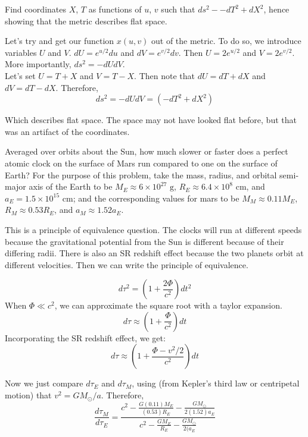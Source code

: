 \documentclass[11pt,largemargins]{homework}
\begin{document}
\begin{alphaparts}
\questionpart
Find coordinates $X$, $T$ as functions of $u$, $v$ such that $ds^2 - -dT^2 + dX^2$, hence showing that the metric describes flat space.

Let's try and get our function $x(u,v)$ out of the metric.  To do so, we introduce variables $U$ and $V$.  $dU = e^{u/2} du$ and $dV = e^{v/2} dv$.  Then $U = 2e^{u/2}$ and $V = 2e^{v/2}.$  More importantly, $ds^2 = -dUdV$. \\ 

Let's set $U = T + X$ and $V = T - X$.  Then note that $dU = dT + dX$ and $dV = dT - dX$.  Therefore, 
$$ ds^2 = - dU dV = (-dT^2 + dX^2) $$

Which describes flat space.  The space may not have looked flat before, but that was an artifact of the coordinates.

\end{alphaparts}


\question
Averaged over orbits about the Sun, how much slower or faster does a perfect atomic clock on the surface of Mars run compared to one on the surface of Earth?  For the purpose of this problem, take the mass, radius, and orbital semi-major axis of the Earth to be $M_E \approx 6 \times 10^{27} \mbox{ g}$, $R_E \approx 6.4 \times 10^8 \mbox{ cm}$, and $a_E = 1.5 \times 10^{15} \mbox{ cm}$; and the corresponding values for mars to be $M_M \approx 0.11 M_E$, $R_M \approx 0.53R_E$, and $a_M \approx 1.52a_E$. 

This is a principle of equivalence question.  The clocks will run at different speeds because the gravitational potential from the Sun is different because of their differing radii.  There is also an SR redshift effect because the two planets orbit at different velocities.  Then we can write the principle of equivalence.

\begin{equation}
d\tau^2 = (1 + \frac{2 \Phi}{c^2}) dt^2
\end{equation}
When $\Phi \ll c^2$, we can approximate the square root with a taylor expansion.
\begin{equation}
d\tau \approx (1 + \frac{\Phi}{c^2}) dt
\end{equation}
Incorporating the SR redshift effect, we get:
\begin{equation}
d\tau \approx (1 + \frac{\Phi - v^2/2}{c^2}) dt
\end{equation}

Now we just compare $d\tau_E$ and $d\tau_M$, using (from Kepler's third law or centripetal motion) that $v^2 = GM_{\odot} / a$. Therefore, 
$$
\frac{d\tau_M}{d\tau_E} = \frac{c^2 - \frac{G(0.11)M_E}{(0.53)R_E} - \frac{GM_{\odot}}{2(1.52)a_E}}{c^2 - \frac{GM_E}{R_E} - \frac{GM_{\odot}}{2(a_E}}
$$
\end{document}
